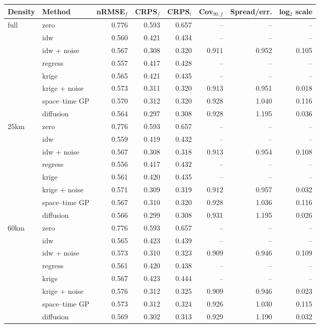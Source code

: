 \begin{tabular}{llrrrrrr}
\toprule
Density & Method & nRMSE$_f$ & CRPS$_f$ & CRPS$_t$ & Cov$_{90,f}$ & Spread/err. & log$_2$ scale \\
\midrule
full & zero & 0.776 & 0.593 & 0.657 & -- & -- & -- \\
 & idw & 0.560 & 0.421 & 0.434 & -- & -- & -- \\
 & idw + noise & 0.567 & 0.308 & 0.320 & 0.911 & 0.952 & 0.105 \\
 & regress & 0.557 & 0.417 & 0.428 & -- & -- & -- \\
 & krige & 0.565 & 0.421 & 0.435 & -- & -- & -- \\
 & krige + noise & 0.573 & 0.311 & 0.320 & 0.913 & 0.951 & 0.018 \\
 & space–time GP & 0.570 & 0.312 & 0.320 & 0.928 & 1.040 & 0.116 \\
 & diffusion & 0.564 & 0.297 & 0.308 & 0.928 & 1.195 & 0.036 \\
\addlinespace
25km & zero & 0.776 & 0.593 & 0.657 & -- & -- & -- \\
 & idw & 0.559 & 0.419 & 0.432 & -- & -- & -- \\
 & idw + noise & 0.567 & 0.308 & 0.318 & 0.913 & 0.954 & 0.108 \\
 & regress & 0.556 & 0.417 & 0.432 & -- & -- & -- \\
 & krige & 0.561 & 0.420 & 0.435 & -- & -- & -- \\
 & krige + noise & 0.571 & 0.309 & 0.319 & 0.912 & 0.957 & 0.032 \\
 & space–time GP & 0.567 & 0.310 & 0.320 & 0.928 & 1.036 & 0.116 \\
 & diffusion & 0.566 & 0.299 & 0.308 & 0.931 & 1.195 & 0.026 \\
\addlinespace
60km & zero & 0.776 & 0.593 & 0.657 & -- & -- & -- \\
 & idw & 0.565 & 0.423 & 0.439 & -- & -- & -- \\
 & idw + noise & 0.573 & 0.310 & 0.323 & 0.909 & 0.946 & 0.109 \\
 & regress & 0.561 & 0.420 & 0.438 & -- & -- & -- \\
 & krige & 0.567 & 0.423 & 0.444 & -- & -- & -- \\
 & krige + noise & 0.576 & 0.312 & 0.325 & 0.909 & 0.946 & 0.023 \\
 & space–time GP & 0.573 & 0.312 & 0.324 & 0.926 & 1.030 & 0.115 \\
 & diffusion & 0.569 & 0.302 & 0.313 & 0.929 & 1.190 & 0.032 \\

\end{tabular}
